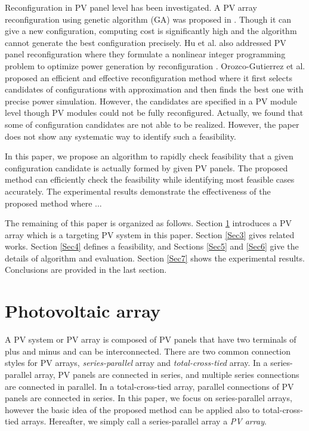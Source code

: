 \documentclass[conference]{IEEEtran}
\begin{document}
Reconfiguration in PV panel level has been investigated\cite{carotenuto2015evolutionary,hu2017non,orozco2016optimized}. 
A PV array reconfiguration using genetic algorithm (GA) was proposed in \cite{carotenuto2015evolutionary}. Though it can give a new configuration, computing cost is significantly high and the algorithm cannot generate the best configuration precisely.  
Hu et al. also addressed PV panel reconfiguration where they formulate a nonlinear integer programming problem to optimize power generation by reconfiguration \cite{hu2017non}.
Orozco-Gutierrez et al. proposed an efficient and effective reconfiguration method\cite{orozco2016optimized} where it first selects candidates of configurations with approximation and then finds the best one with precise power simulation. However, the candidates are specified in a PV module level though PV modules could not be fully reconfigured. Actually, we found that some of configuration candidates are not able to be realized. However, the paper\cite{orozco2016optimized}  does not show any systematic way to identify such a feasibility. 

In this paper, we propose an algorithm to rapidly check feasibility that a given configuration candidate is actually formed by given PV panels. The proposed method can efficiently check the feasibility while identifying most feasible cases accurately. The experimental results demonstrate the effectiveness of the proposed method where ...

The remaining of this paper is organized as follows. Section \ref{Sec2} introduces a PV array which is a targeting PV system in this paper. Section \ref{Sec3} gives related works. Section \ref{Sec4} defines a feasibility, and Sections \ref{Sec5} and \ref{Sec6} give the details of algorithm and evaluation. Section \ref{Sec7} shows the experimental results. Conclusions are provided in the last section.

\section{Photovoltaic array}\label{Sec2}
A PV system or PV array is composed of PV panels that have two terminals of plus and minus and can be interconnected. There are two common connection styles for PV arrays, \textit{series-parallel} array and \textit{total-cross-tied} array. 
In a series-parallel array, PV panels are connected in series, and multiple series connections are connected in parallel. In a total-cross-tied array, parallel connections of PV panels are connected in series. In this paper, we focus on series-parallel arrays, however the basic idea of the proposed method can be applied also to total-cross-tied arrays. Hereafter, we simply call a series-parallel array a \textit{PV array}. 
\end{document}
